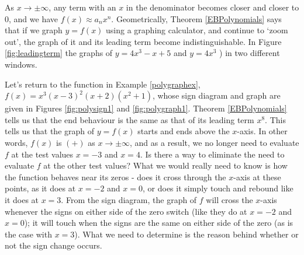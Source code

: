 As $x \rightarrow \pm \infty$, any term with an $x$ in the denominator becomes closer and closer to $0$, and we have $f(x) \approx a_{n} x^{n}$.  Geometrically, Theorem \ref{EBPolynomials} says that if we graph $y=f(x)$ using a graphing calculator, and continue to `zoom out', the graph of it and its leading term become indistinguishable.  In Figure \ref{fig:leadingterm} the graphs of $y=4x^3-x+5$  and $y=4x^3$ ) in two different windows.


Let's return to the function in Example \ref{polygraphex}, $f(x) = x^3 (x-3)^2 (x+2)\left(x^2+1\right)$, whose sign diagram and graph are given in Figures \ref{fig:polysign1} and \ref{fig:polygraph1}.  Theorem \ref{EBPolynomials} tells us that the end behaviour is the same as that of its leading term $x^{8}$.  This tells us that the graph of $y=f(x)$ starts and ends above the $x$-axis.  In other words, $f(x)$ is $(+)$ as $x \rightarrow \pm \infty$, and as a result, we no longer need to evaluate $f$ at the test values $x=-3$ and $x=4$.  Is there a way to eliminate the need to evaluate $f$ at the other test values?  What we would really need to know is how the function behaves near its zeros - does it cross through the $x$-axis at these points, as it does at $x=-2$ and $x=0$, or does it simply touch and rebound like it does at $x=3$.  From the sign diagram, the graph of $f$ will cross the $x$-axis whenever the signs on either side of the zero switch (like they do at $x=-2$ and $x=0$);  it will touch when the signs are the same on either side of the zero (as is the case with $x=3$). What we need to determine is the reason behind whether or not the sign change occurs.



